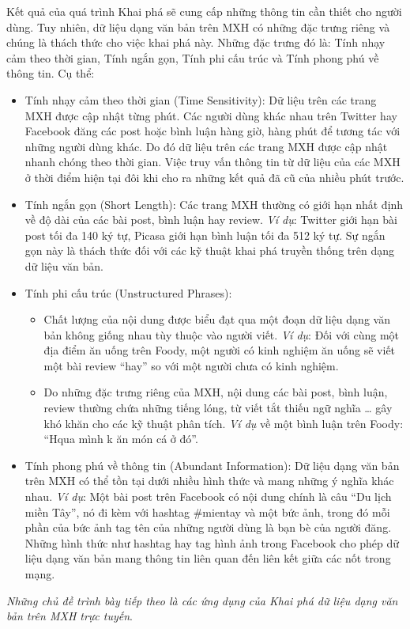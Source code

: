 \documentclass[12pt]{extarticle}
\begin{document}
			\par Kết quả của quá trình Khai phá sẽ cung cấp những thông tin cần thiết cho người dùng. Tuy nhiên, dữ liệu dạng văn bản trên MXH có những đặc trưng riêng và chúng là thách thức cho việc khai phá này. Những đặc trưng đó là: Tính nhạy cảm theo thời gian, Tính ngắn gọn, Tính phi cấu trúc và Tính phong phú về thông tin. Cụ thể:
			\begin{itemize}
				\item Tính nhạy cảm theo thời gian (Time Sensitivity): Dữ liệu trên các trang MXH được cập nhật từng phút. Các người dùng khác nhau trên Twitter hay Facebook đăng các post hoặc bình luận hàng giờ, hàng phút để tương tác với những người dùng khác. Do đó dữ liệu trên các trang MXH được cập nhật nhanh chóng theo thời gian. Việc truy vấn thông tin từ dữ liệu của các MXH ở thời điểm hiện tại đôi khi cho ra những kết quả đã cũ của nhiều phút trước.  
				\item Tính ngắn gọn (Short Length): Các trang MXH thường có giới hạn nhất định về độ dài của các bài post, bình luận hay review. \textit{Ví dụ}: Twitter giới hạn bài post tối đa 140 ký tự, Picasa giới hạn bình luận tối đa 512 ký tự. Sự ngắn gọn này là thách thức đối với các kỹ thuật khai phá truyền thống trên dạng dữ liệu văn bản.
				\item Tính phi cấu trúc (Unstructured Phrases):
					\begin{itemize}
						\item Chất lượng của nội dung được biểu đạt qua một đoạn dữ liệu dạng văn bản không giống nhau tùy thuộc vào người viết. \textit{Ví dụ}: Đối với cùng một địa điểm ăn uống trên Foody, một người có kinh nghiệm ăn uống sẽ viết một bài review “hay” so với một người chưa có kinh nghiệm.
						\item Do những đặc trưng riêng của MXH, nội dung các bài post, bình luận, review thường chứa những tiếng lóng, từ viết tắt thiếu ngữ nghĩa … gây khó khăn cho các kỹ thuật phân tích. \textit{Ví dụ} về một bình luận trên Foody: “Hqua mình k ăn món cá ở đó”.
					\end{itemize}
				\item Tính phong phú về thông tin (Abundant Information): Dữ liệu dạng văn bản trên MXH có thể tồn tại dưới nhiều hình thức và mang những ý nghĩa khác nhau. \textit{Ví dụ}: Một bài post trên Facebook có nội dung chính là câu “Du lịch miền Tây”, nó đi kèm với hashtag \#mientay và một bức ảnh, trong đó mỗi phần của bức ảnh tag tên của những người dùng là bạn bè của người đăng. Những hình thức như hashtag hay tag hình ảnh trong Facebook cho phép dữ liệu dạng văn bản mang thông tin liên quan đến liên kết giữa các nốt trong mạng.
			\end{itemize}
			\par \textit{Những chủ đề trình bày tiếp theo là các ứng dụng của Khai phá dữ liệu dạng văn bản trên MXH trực tuyến}.
					
\end{document}
